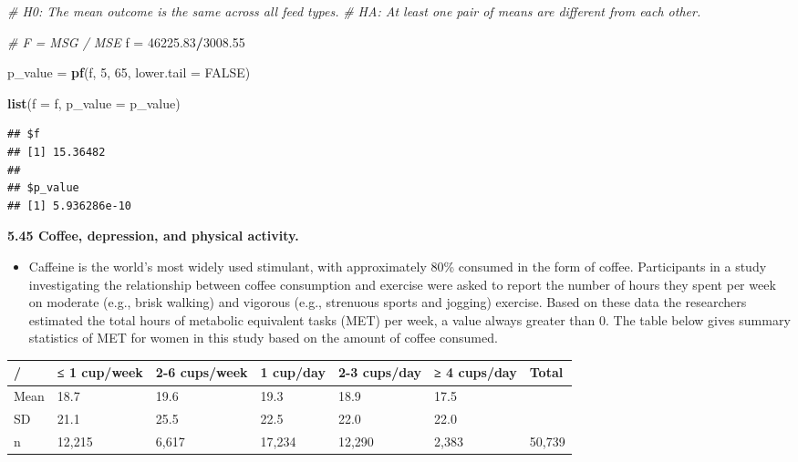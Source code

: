 \documentclass[]{book}
\newenvironment{Shaded}{\begin{snugshade}}{\end{snugshade}}
\newcommand{\CommentTok}[1]{\textcolor[rgb]{0.56,0.35,0.01}{\textit{#1}}}
\newcommand{\DataTypeTok}[1]{\textcolor[rgb]{0.13,0.29,0.53}{#1}}
\newcommand{\DecValTok}[1]{\textcolor[rgb]{0.00,0.00,0.81}{#1}}
\newcommand{\FloatTok}[1]{\textcolor[rgb]{0.00,0.00,0.81}{#1}}
\newcommand{\KeywordTok}[1]{\textcolor[rgb]{0.13,0.29,0.53}{\textbf{#1}}}
\newcommand{\NormalTok}[1]{#1}
\newcommand{\OperatorTok}[1]{\textcolor[rgb]{0.81,0.36,0.00}{\textbf{#1}}}
\newcommand{\OtherTok}[1]{\textcolor[rgb]{0.56,0.35,0.01}{#1}}
\newcommand{\StringTok}[1]{\textcolor[rgb]{0.31,0.60,0.02}{#1}}
\providecommand{\tightlist}{%
  \setlength{\itemsep}{0pt}\setlength{\parskip}{0pt}}
\begin{document}
\begin{Shaded}
\begin{Highlighting}[]
\CommentTok{# H0: The mean outcome is the same across all feed types.}
\CommentTok{# HA: At least one pair of means are different from each other.}

\CommentTok{# F = MSG / MSE}
\NormalTok{f =}\StringTok{ }\FloatTok{46225.83}\OperatorTok{/}\FloatTok{3008.55}

\NormalTok{p_value =}\StringTok{ }\KeywordTok{pf}\NormalTok{(f, }\DecValTok{5}\NormalTok{, }\DecValTok{65}\NormalTok{, }\DataTypeTok{lower.tail =} \OtherTok{FALSE}\NormalTok{)}

\KeywordTok{list}\NormalTok{(}\DataTypeTok{f =}\NormalTok{ f, }\DataTypeTok{p_value =}\NormalTok{ p_value)}
\end{Highlighting}
\end{Shaded}

\begin{verbatim}
## $f
## [1] 15.36482
## 
## $p_value
## [1] 5.936286e-10
\end{verbatim}

\textbf{5.45 Coffee, depression, and physical activity.}

\begin{itemize}
\tightlist
\item
  Caffeine is the world's most widely used stimulant, with approximately 80\% consumed in the form of coffee. Participants in a study investigating the relationship between coffee consumption and exercise were asked to report the number of hours they spent per week on moderate (e.g., brisk walking) and vigorous (e.g., strenuous sports and jogging) exercise. Based on these data the researchers estimated the total hours of metabolic equivalent tasks (MET) per week, a value always greater than 0. The table below gives summary statistics of MET for women in this study based on the amount of coffee consumed.
\end{itemize}

\begin{longtable}[]{@{}lllllll@{}}
\toprule
/ & ≤ 1 cup/week & 2-6 cups/week & 1 cup/day & 2-3 cups/day & ≥ 4 cups/day & Total\tabularnewline
\midrule
\endhead
Mean & 18.7 & 19.6 & 19.3 & 18.9 & 17.5 &\tabularnewline
SD & 21.1 & 25.5 & 22.5 & 22.0 & 22.0 &\tabularnewline
n & 12,215 & 6,617 & 17,234 & 12,290 & 2,383 & 50,739\tabularnewline
\bottomrule
\end{longtable}
\end{document}
